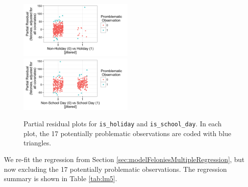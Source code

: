 \documentclass[11pt,notitlepage]{article}
\newenvironment{codeSmall}%
   {\par\noindent\adjustbox{margin=1ex,bgcolor=shadecolor,margin=0ex \medskipamount}\bgroup\minipage\linewidth\verbatim\footnotesize}%
   {\endverbatim\endminipage\egroup}
\begin{document}
\begin{figure}[!h]
  \centering
  \captionsetup{width=0.9\textwidth}
  \subfloat%
  		{\includegraphics[width=0.5\textwidth]
  		{figures/lm4PresIsHoliday.png}\label{fig:lm4PresIsHoliday}}
  \hfill
  \subfloat%
  		{\includegraphics[width=0.5\textwidth]
  		{figures/lm4PresIsSchoolDay.png}\label{fig:lm4PresIsSchoolDay}}
  \vspace*{-3mm}
  \caption{Partial residual plots for \texttt{is_holiday} and \texttt{is_school_day}. In each plot, the 17 potentially problematic observations are coded with blue triangles.}
  \label{fig:lm4Pres}
  \vspace*{-3mm}
\end{figure}




We re-fit the regression from Section \ref{sec:modelFeloniesMultipleRegression}, but now excluding the 17 potentially problematic observations. The regression summary is shown in Table \ref{tab:lm5}.

\end{document}
